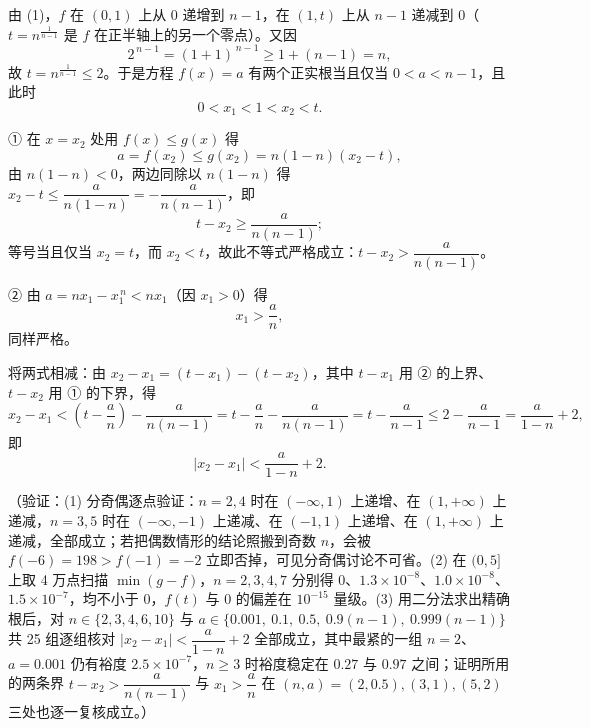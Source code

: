 \begin{answer}

由 (1)，\(f\) 在 \((0,1)\) 上从 \(0\) 递增到 \(n-1\)，在 \((1,t)\) 上从 \(n-1\) 递减到 \(0\)（\(t=n^{\frac{1}{n-1}}\) 是 \(f\) 在正半轴上的另一个零点）。又因
\nopagebreak[4]
\[
2^{\,n-1}=(1+1)^{\,n-1}\geqslant1+(n-1)=n,
\]
故 \(t=n^{\frac{1}{n-1}}\leqslant2\)。于是方程 \(f(x)=a\) 有两个正实根当且仅当 \(0<a<n-1\)，且此时
\nopagebreak[4]
\[
0<x_{1}<1<x_{2}<t .
\]

① 在 \(x=x_{2}\) 处用 \(f(x)\leqslant g(x)\) 得
\nopagebreak[4]
\[
a=f(x_{2})\leqslant g(x_{2})=n(1-n)(x_{2}-t),
\]
由 \(n(1-n)<0\)，两边同除以 \(n(1-n)\) 得 \(x_{2}-t\leqslant\dfrac{a}{n(1-n)}=-\dfrac{a}{n(n-1)}\)，即
\nopagebreak[4]
\[
t-x_{2}\geqslant\dfrac{a}{n(n-1)} ;
\]
等号当且仅当 \(x_{2}=t\)，而 \(x_{2}<t\)，故此不等式严格成立：\(t-x_{2}>\dfrac{a}{n(n-1)}\)。

② 由 \(a=nx_{1}-x_{1}^{\,n}<nx_{1}\)（因 \(x_{1}>0\)）得
\nopagebreak[4]
\[
x_{1}>\dfrac{a}{n},
\]
同样严格。

将两式相减：由 \(x_{2}-x_{1}=(t-x_{1})-(t-x_{2})\)，其中 \(t-x_{1}\) 用 ② 的上界、\(t-x_{2}\) 用 ① 的下界，得
\nopagebreak[4]
\[
x_{2}-x_{1}<\left(t-\dfrac{a}{n}\right)-\dfrac{a}{n(n-1)}
=t-\dfrac{a}{n}-\dfrac{a}{n(n-1)}=t-\dfrac{a}{n-1}\leqslant2-\dfrac{a}{n-1}=\dfrac{a}{1-n}+2,
\]
即
\nopagebreak[4]
\[
\left|x_{2}-x_{1}\right|<\dfrac{a}{1-n}+2 .
\]

（验证：(1) 分奇偶逐点验证：\(n=2,4\) 时在 \((-\infty,1)\) 上递增、在 \((1,+\infty)\) 上递减，\(n=3,5\) 时在 \((-\infty,-1)\) 上递减、在 \((-1,1)\) 上递增、在 \((1,+\infty)\) 上递减，全部成立；若把偶数情形的结论照搬到奇数 \(n\)，会被 \(f(-6)=198>f(-1)=-2\) 立即否掉，可见分奇偶讨论不可省。(2) 在 \((0,5]\) 上取 4 万点扫描 \(\min(g-f)\)，\(n=2,3,4,7\) 分别得 \(0\)、\(1.3\times10^{-8}\)、\(1.0\times10^{-8}\)、\(1.5\times10^{-7}\)，均不小于 0，\(f(t)\) 与 0 的偏差在 \(10^{-15}\) 量级。(3) 用二分法求出精确根后，对 \(n\in\{2,3,4,6,10\}\) 与 \(a\in\{0.001,\ 0.1,\ 0.5,\ 0.9(n-1),\ 0.999(n-1)\}\) 共 25 组逐组核对 \(\left|x_{2}-x_{1}\right|<\dfrac{a}{1-n}+2\) 全部成立，其中最紧的一组 \(n=2\)、\(a=0.001\) 仍有裕度 \(2.5\times10^{-7}\)，\(n\geqslant3\) 时裕度稳定在 \(0.27\) 与 \(0.97\) 之间；证明所用的两条界 \(t-x_{2}>\dfrac{a}{n(n-1)}\) 与 \(x_{1}>\dfrac{a}{n}\) 在 \((n,a)=(2,0.5),(3,1),(5,2)\) 三处也逐一复核成立。）



\end{answer}
